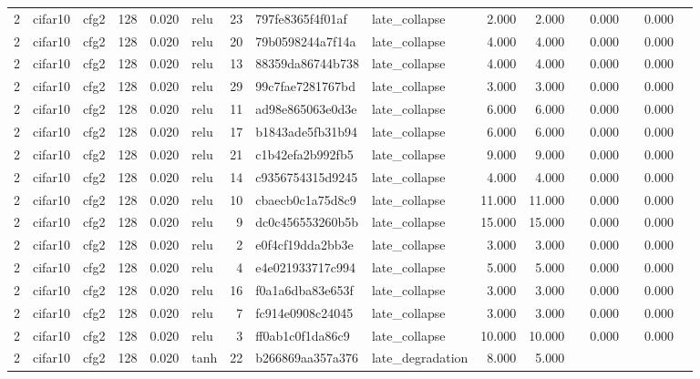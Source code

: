 \begin{table}[htbp]
{\begin{tabular}{@{}rllrrlrllrrrrrrr@{}}
2 & cifar10 & cfg2 & 128 & 0.020 & relu & 23 & 797fe8365f4f01af & late\_collapse & 2.000 & 2.000 &  & 0.000 &  & 0.000 &  \\
2 & cifar10 & cfg2 & 128 & 0.020 & relu & 20 & 79b0598244a7f14a & late\_collapse & 4.000 & 4.000 &  & 0.000 &  & 0.000 &  \\
2 & cifar10 & cfg2 & 128 & 0.020 & relu & 13 & 88359da86744b738 & late\_collapse & 4.000 & 4.000 &  & 0.000 &  & 0.000 &  \\
2 & cifar10 & cfg2 & 128 & 0.020 & relu & 29 & 99c7fae7281767bd & late\_collapse & 3.000 & 3.000 &  & 0.000 &  & 0.000 &  \\
2 & cifar10 & cfg2 & 128 & 0.020 & relu & 11 & ad98e865063e0d3e & late\_collapse & 6.000 & 6.000 &  & 0.000 &  & 0.000 &  \\
2 & cifar10 & cfg2 & 128 & 0.020 & relu & 17 & b1843ade5fb31b94 & late\_collapse & 6.000 & 6.000 &  & 0.000 &  & 0.000 &  \\
2 & cifar10 & cfg2 & 128 & 0.020 & relu & 21 & c1b42efa2b992fb5 & late\_collapse & 9.000 & 9.000 &  & 0.000 &  & 0.000 &  \\
2 & cifar10 & cfg2 & 128 & 0.020 & relu & 14 & c9356754315d9245 & late\_collapse & 4.000 & 4.000 &  & 0.000 &  & 0.000 &  \\
2 & cifar10 & cfg2 & 128 & 0.020 & relu & 10 & cbaecb0c1a75d8c9 & late\_collapse & 11.000 & 11.000 &  & 0.000 &  & 0.000 &  \\
2 & cifar10 & cfg2 & 128 & 0.020 & relu & 9 & dc0c456553260b5b & late\_collapse & 15.000 & 15.000 &  & 0.000 &  & 0.000 &  \\
2 & cifar10 & cfg2 & 128 & 0.020 & relu & 2 & e0f4cf19dda2bb3e & late\_collapse & 3.000 & 3.000 &  & 0.000 &  & 0.000 &  \\
2 & cifar10 & cfg2 & 128 & 0.020 & relu & 4 & e4e021933717c994 & late\_collapse & 5.000 & 5.000 &  & 0.000 &  & 0.000 &  \\
2 & cifar10 & cfg2 & 128 & 0.020 & relu & 16 & f0a1a6dba83e653f & late\_collapse & 3.000 & 3.000 &  & 0.000 &  & 0.000 &  \\
2 & cifar10 & cfg2 & 128 & 0.020 & relu & 7 & fc914e0908c24045 & late\_collapse & 3.000 & 3.000 &  & 0.000 &  & 0.000 &  \\
2 & cifar10 & cfg2 & 128 & 0.020 & relu & 3 & ff0ab1c0f1da86c9 & late\_collapse & 10.000 & 10.000 &  & 0.000 &  & 0.000 &  \\
2 & cifar10 & cfg2 & 128 & 0.020 & tanh & 22 & b266869aa357a376 & late\_degradation & 8.000 & 5.000 &  &  &  &  &  \\

\end{tabular}}
\end{table}
